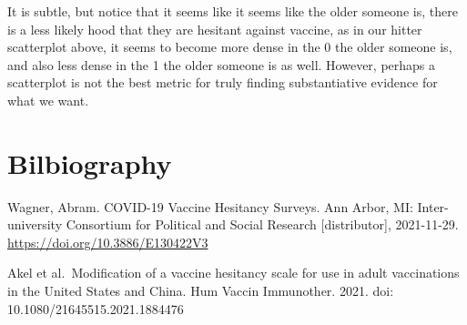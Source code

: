 \documentclass[
]{article}
\begin{document}
It is subtle, but notice that it seems like it seems like the older
someone is, there is a less likely hood that they are hesitant against
vaccine, as in our hitter scatterplot above, it seems to become more
dense in the 0 the older someone is, and also less dense in the 1 the
older someone is as well. However, perhaps a scatterplot is not the best
metric for truly finding substantiative evidence for what we want.

\hypertarget{bilbiography}{%
\section{Bilbiography}\label{bilbiography}}

Wagner, Abram. COVID-19 Vaccine Hesitancy Surveys. Ann Arbor, MI:
Inter-university Consortium for Political and Social Research
{[}distributor{]}, 2021-11-29. \url{https://doi.org/10.3886/E130422V3}

Akel et al.~Modification of a vaccine hesitancy scale for use in adult
vaccinations in the United States and China. Hum Vaccin Immunother.
2021. doi: 10.1080/21645515.2021.1884476
\end{document}
